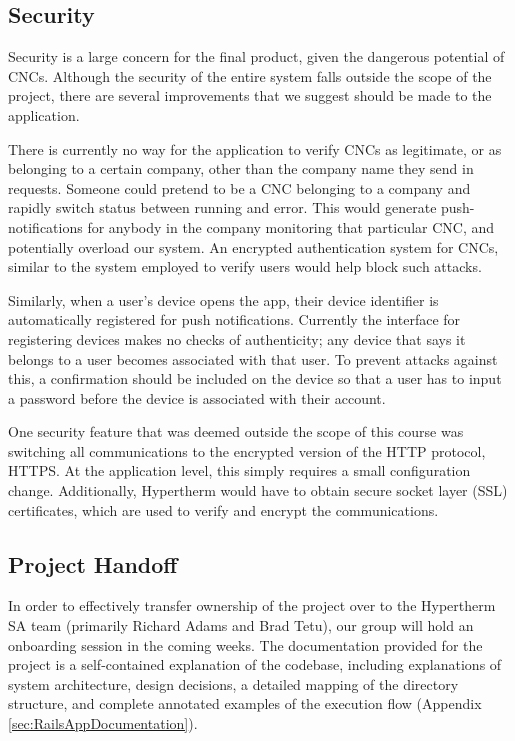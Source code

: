 \documentclass[12pt,letterpaper,titlepage]{article}
\begin{document}
\subsection{Security} \label{sec:Security}

Security is a large concern for the final product, given the dangerous potential of CNCs. Although the security of the entire system falls outside the scope of the project, there are several improvements that we suggest should be made to the application. 

There is currently no way for the application to verify CNCs as legitimate, or as belonging to a certain company, other than the company name they send in requests. Someone could pretend to be a CNC belonging to a company and rapidly switch status between running and error. This would generate push-notifications for anybody in the company monitoring that particular CNC, and potentially overload our system. An encrypted authentication system for CNCs, similar to the system employed to verify users would help block such attacks.

Similarly, when a user's device opens the app, their device identifier is automatically registered for push notifications. Currently the interface for registering devices makes no checks of authenticity; any device that says it belongs to a user becomes associated with that user. To prevent attacks against this, a confirmation should be included on the device so that a user has to input a password before the device is associated with their account.

One security feature that was deemed outside the scope of this course was switching all communications to the encrypted version of the HTTP protocol, HTTPS. At the application level, this simply requires a small configuration change. Additionally, Hypertherm would have to obtain secure socket layer (SSL) certificates, which are used to verify and encrypt the communications.

\subsection{Project Handoff} \label{sec:ProjectHandoff}

In order to effectively transfer ownership of the project over to the Hypertherm SA team (primarily Richard Adams and Brad Tetu), our group will hold an onboarding session in the coming weeks. The documentation provided for the project is a self-contained explanation of the codebase, including explanations of system architecture, design decisions, a detailed mapping of the directory structure, and complete annotated examples of the execution flow (Appendix \ref{sec:RailsAppDocumentation}).
\end{document}
